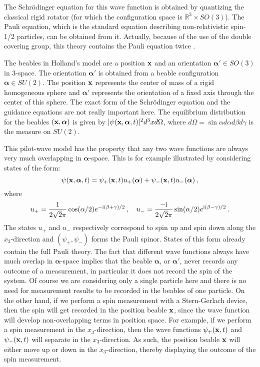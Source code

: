 \documentclass[12pt]{article}
\def\ii{\textrm i}
\begin{document}
The Schr{\"o}\-ding\-er equation for this wave function is obtained by quantizing the classical rigid rotator (for which the configuration space is ${\mathbb R}^3 \times SO(3)$). The Pauli equation, which is the standard equation describing non-relativistic spin-1/2 particles, can be obtained from it. Actually, because of the use of the double covering group, this theory contains the Pauli equation twice \cite[pp.\ 439-441]{holland93b}. 

The beables in Holland's model are a position ${\bf x}$ and an orientation ${\boldsymbol \alpha}' \in SO(3)$ in 3-space. The orientation ${\boldsymbol \alpha}'$ is obtained from a beable configuration ${\boldsymbol \alpha} \in SU(2)$. The position ${\bf x}$ represents the center of mass of a rigid homogeneous sphere and ${\boldsymbol \alpha}'$ represents the orientation of a fixed axis through the center of this sphere. The exact form of the Schr{\"o}\-ding\-er equation and the guidance equations are not really important here. The equilibrium distribution for the beables $({\bf x},{\boldsymbol \alpha})$ is given by $|\psi({\bf x},{\boldsymbol \alpha},t)|^2 d^3 x d\Omega$, where $d\Omega= \sin \alpha d\alpha d\beta d\gamma$ is the measure on $SU(2)$. 

This pilot-wave model has the property that any two wave functions are always very much overlapping in ${\boldsymbol \alpha}$-space. This is for example illustrated by considering states of the form:
\begin{equation}
\psi({\bf x},{\boldsymbol \alpha},t) = \psi_+({\bf x},t) u_+({\boldsymbol \alpha}) + \psi_{-}({\bf x},t) u_{-}({\boldsymbol \alpha})\,,
\label{fh.1}
\end{equation}
where
\begin{equation}
u_+ = \frac{1}{2\sqrt{2} \pi} \cos(\alpha/2) e^{-\ii( \beta +\gamma)/2}\,,\quad   u_- = \frac{-\ii}{2\sqrt{2} \pi} \sin(\alpha/2) e^{\ii(  \beta - \gamma)/2}\,.
\label{fh.2}
\end{equation}
The states $u_+$ and $u_-$ respectively correspond to spin up and spin down along the $x_3$-direction and $(\psi_+,\psi_-)$ forms the Pauli spinor. States of this form already contain the full Pauli theory. The fact that different wave functions always have much overlap in ${\boldsymbol \alpha}$-space implies that the beable ${\boldsymbol \alpha}$, or ${\boldsymbol \alpha}'$, never records any outcome of a measurement, in particular it does not record the spin of the system. Of course we are considering only a single particle here and there is no need for measurement results to be recorded in the beables of one particle. On the other hand, if we perform a spin measurement with a Stern-Gerlach device, then the spin will get recorded in the position beable ${\bf x}$, since the wave function will develop non-overlapping terms in position space. For example, if we perform a spin measurement in the $x_3$-direction, then the wave functions $\psi_+({\bf x},t)$ and $\psi_-({\bf x},t)$ will separate in the $x_3$-direction. As such, the position beable ${\bf x}$ will either move up or down in the $x_3$-direction, thereby displaying the outcome of the spin measurement. 
\end{document}
